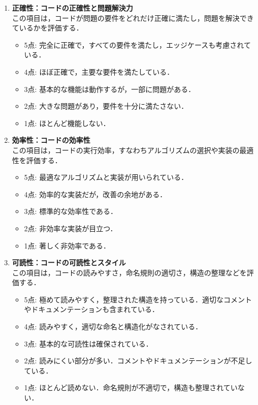 \documentclass[11pt]{jreport}
\begin{document}
\begin{enumerate}
    \item \textbf{正確性：コードの正確性と問題解決力} \\
    この項目は，コードが問題の要件をどれだけ正確に満たし，問題を解決できているかを評価する．
    \begin{itemize}
        \item 5点: 完全に正確で，すべての要件を満たし，エッジケースも考慮されている．
        \item 4点: ほぼ正確で，主要な要件を満たしている．
        \item 3点: 基本的な機能は動作するが，一部に問題がある．
        \item 2点: 大きな問題があり，要件を十分に満たさない．
        \item 1点: ほとんど機能しない．
    \end{itemize}
    \item \textbf{効率性：コードの効率性} \\
    この項目は，コードの実行効率，すなわちアルゴリズムの選択や実装の最適性を評価する．
    \begin{itemize}
        \item 5点: 最適なアルゴリズムと実装が用いられている．
        \item 4点: 効率的な実装だが，改善の余地がある．
        \item 3点: 標準的な効率性である．
        \item 2点: 非効率な実装が目立つ．
        \item 1点: 著しく非効率である．
    \end{itemize}
    \item \textbf{可読性：コードの可読性とスタイル} \\
    この項目は，コードの読みやすさ，命名規則の適切さ，構造の整理などを評価する．
    \begin{itemize}
        \item 5点: 極めて読みやすく，整理された構造を持っている．適切なコメントやドキュメンテーションも含まれている．
        \item 4点: 読みやすく，適切な命名と構造化がなされている．
        \item 3点: 基本的な可読性は確保されている．
        \item 2点: 読みにくい部分が多い．コメントやドキュメンテーションが不足している．
        \item 1点: ほとんど読めない．命名規則が不適切で，構造も整理されていない．
    \end{itemize}

\end{enumerate}
\end{document}
